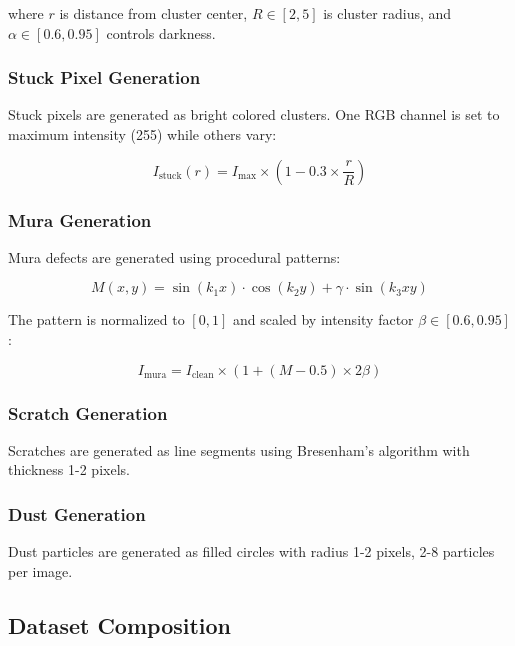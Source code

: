 \documentclass[12pt,a4paper]{article}
\begin{document}
where $r$ is distance from cluster center, $R \in [2,5]$ is cluster 
radius, and $\alpha \in [0.6, 0.95]$ controls darkness.

\subsubsection{Stuck Pixel Generation}

Stuck pixels are generated as bright colored clusters. One RGB channel 
is set to maximum intensity (255) while others vary:

\begin{equation}
I_{\text{stuck}}(r) = I_{\text{max}} \times (1 - 0.3 \times \frac{r}{R})
\end{equation}

\subsubsection{Mura Generation}

Mura defects are generated using procedural patterns:

\begin{equation}
M(x,y) = \sin(k_1 x) \cdot \cos(k_2 y) + \gamma \cdot \sin(k_3 xy)
\end{equation}

The pattern is normalized to $[0,1]$ and scaled by intensity factor 
$\beta \in [0.6, 0.95]$:

\begin{equation}
I_{\text{mura}} = I_{\text{clean}} \times (1 + (M - 0.5) \times 2\beta)
\end{equation}

\subsubsection{Scratch Generation}

Scratches are generated as line segments using Bresenham's algorithm 
with thickness 1-2 pixels.

\subsubsection{Dust Generation}

Dust particles are generated as filled circles with radius 1-2 pixels, 
2-8 particles per image.

\subsection{Dataset Composition}
\end{document}
